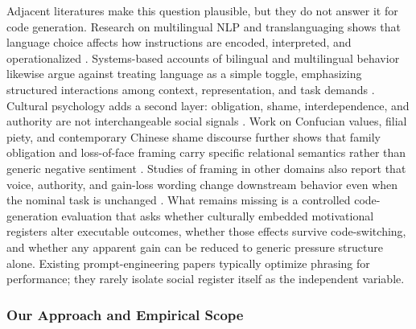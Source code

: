 \documentclass{article}
\begin{document}
Adjacent literatures make this question plausible, but they do not answer it for code generation. Research on multilingual NLP and translanguaging shows that language choice affects how instructions are encoded, interpreted, and operationalized \cite{cenoz2020teaching, wei2023transformative, gorter2020teachers}. Systems-based accounts of bilingual and multilingual behavior likewise argue against treating language as a simple toggle, emphasizing structured interactions among context, representation, and task demands \cite{titone2022rethinking}. Cultural psychology adds a second layer: obligation, shame, interdependence, and authority are not interchangeable social signals \cite{kitayama2022varieties}. Work on Confucian values, filial piety, and contemporary Chinese shame discourse further shows that family obligation and loss-of-face framing carry specific relational semantics rather than generic negative sentiment \cite{badanta2022confucianism, yuan2022confucian, li2021crosscultural, tang2022cultural}. Studies of framing in other domains also report that voice, authority, and gain-loss wording change downstream behavior even when the nominal task is unchanged \cite{liu2023nudging, tiffany2020gainloss, perosanz2020narrative}. What remains missing is a controlled code-generation evaluation that asks whether culturally embedded motivational registers alter executable outcomes, whether those effects survive code-switching, and whether any apparent gain can be reduced to generic pressure structure alone. Existing prompt-engineering papers typically optimize phrasing for performance; they rarely isolate social register itself as the independent variable.

\subsubsection{Our Approach and Empirical Scope}

\label{sec:our_approach_and_empirical_scope}
\end{document}
